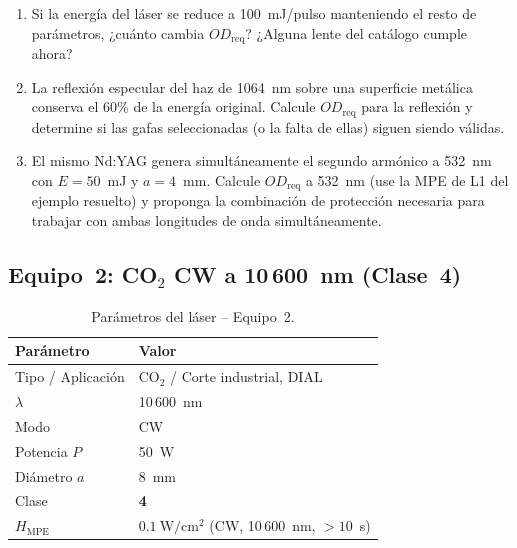 \documentclass[12pt,a4paper]{article}
\begin{document}
\begin{enumerate}
	\item[\textbf{P1.1}] Si la energía del láser se reduce a 100~mJ/pulso
	      manteniendo el resto de parámetros, ¿cuánto cambia $OD_{\mathrm{req}}$?
	      ¿Alguna lente del catálogo cumple ahora?

	\item[\textbf{P1.2}] La reflexión especular del haz de 1064~nm sobre una
	      superficie metálica conserva el 60\% de la energía original. Calcule
	      $OD_{\mathrm{req}}$ para la reflexión y determine si las gafas
	      seleccionadas (o la falta de ellas) siguen siendo válidas.

	\item[\textbf{P1.3}] El mismo Nd:YAG genera simultáneamente el segundo
	      armónico a 532~nm con $E = 50$~mJ y $a = 4$~mm. Calcule
	      $OD_{\mathrm{req}}$ a 532~nm (use la MPE de L1 del ejemplo resuelto)
	      y proponga la combinación de protección necesaria para trabajar con
	      ambas longitudes de onda simultáneamente.
\end{enumerate}

\subsection{Equipo~2: CO$_2$ CW a 10\,600~nm (Clase~4)}
\label{sec:eq2}

\begin{table}[H]
	\centering
	\caption{Parámetros del láser -- Equipo~2.}
	\small
	\begin{tabular}{l l}
		\toprule
		\textbf{Parámetro} & \textbf{Valor}                                                      \\
		\midrule
		Tipo / Aplicación  & CO$_2$ / Corte industrial, DIAL                                     \\
		$\lambda$          & 10\,600~nm                                                          \\
		Modo               & CW                                                                  \\
		Potencia $P$       & 50~W                                                                \\
		Diámetro $a$       & 8~mm                                                                \\
		\rowcolor{aerored!15}
		Clase              & \textbf{4}                                                          \\
		$H_{\mathrm{MPE}}$ & $\SI{0.1}{\watt\per\centi\metre\squared}$ (CW, 10\,600~nm, $>10$~s) \\
		\bottomrule
	\end{tabular}
\end{table}
\end{document}
